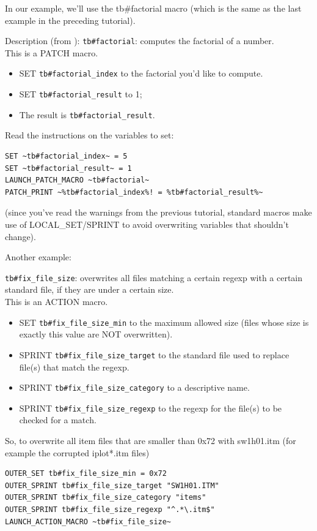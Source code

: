 \documentclass{article}
\begin{document}
In our example, we'll use the tb\#factorial macro (which is the same as the
last example in the preceding tutorial).

Description (from ):
\verb+tb#factorial+: computes the factorial of a number. \\
This is a PATCH macro.
\begin{itemize}
\item SET \verb+tb#factorial_index+ to the factorial you'd like to compute.
\item SET \verb+tb#factorial_result+ to 1;
\item The result is \verb+tb#factorial_result+.
\end{itemize}

Read the instructions on the variables to set:
\begin{verbatim}
SET ~tb#factorial_index~ = 5
SET ~tb#factorial_result~ = 1
LAUNCH_PATCH_MACRO ~tb#factorial~
PATCH_PRINT ~%tb#factorial_index%! = %tb#factorial_result%~
\end{verbatim}
(since you've read the warnings from the previous tutorial, standard macros
make use of LOCAL_SET/SPRINT to avoid overwriting variables that shouldn't
change).

Another example:

\verb+tb#fix_file_size+: overwrites all files matching a certain regexp with a
certain standard file, if they are under a certain size. \\
This is an ACTION macro.
\begin{itemize}
\item SET \verb+tb#fix_file_size_min+ to the maximum allowed size
(files whose size is exactly this value are NOT overwritten).
\item SPRINT \verb+tb#fix_file_size_target+ to the standard file used to replace file(s) that match the regexp.
\item SPRINT \verb+tb#fix_file_size_category+ to a descriptive name.
\item SPRINT \verb+tb#fix_file_size_regexp+ to the regexp for the file(s) to be checked for a match.
\end{itemize}
So, to overwrite all item files that are smaller than 0x72 with sw1h01.itm
(for example the corrupted iplot*.itm files)
\begin{verbatim}
OUTER_SET tb#fix_file_size_min = 0x72
OUTER_SPRINT tb#fix_file_size_target "SW1H01.ITM"
OUTER_SPRINT tb#fix_file_size_category "items"
OUTER_SPRINT tb#fix_file_size_regexp "^.*\.itm$"
LAUNCH_ACTION_MACRO ~tb#fix_file_size~
\end{verbatim}
\end{document}
